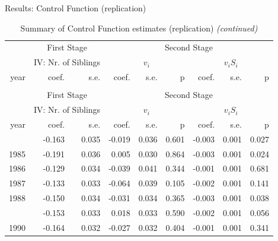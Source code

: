 \documentclass[10pt,ignorenonframetext,]{beamer}
\begin{document}
\begin{frame}{Results: Control Function (replication)}
\protect\hypertarget{results-control-function-replication}{}

\begingroup\fontsize{7}{9}\selectfont

\begin{longtable}[t]{rrrrrrrrr}
\caption{\label{tab:unnamed-chunk-5}Summary of Control Function estimates (replication)}\\
\toprule
\multicolumn{1}{c}{ } & \multicolumn{2}{c}{First Stage} & \multicolumn{6}{c}{Second Stage} \\
\cmidrule(l{2pt}r{2pt}){2-3} \cmidrule(l{2pt}r{2pt}){4-9}
\multicolumn{1}{c}{ } & \multicolumn{2}{c}{IV: Nr. of Siblings} & \multicolumn{3}{c}{$v_i$} & \multicolumn{3}{c}{$v_i S_i$} \\
\cmidrule(l{2pt}r{2pt}){2-3} \cmidrule(l{2pt}r{2pt}){4-6} \cmidrule(l{2pt}r{2pt}){7-9}
year & coef. & s.e. & coef. & s.e. & p & coef. & s.e. & p\\
\midrule
\endfirsthead
\caption[]{Summary of Control Function estimates (replication) \textit{(continued)}}\\
\toprule
\multicolumn{1}{c}{ } & \multicolumn{2}{c}{First Stage} & \multicolumn{6}{c}{Second Stage} \\
\cmidrule(l{2pt}r{2pt}){2-3} \cmidrule(l{2pt}r{2pt}){4-9}
\multicolumn{1}{c}{ } & \multicolumn{2}{c}{IV: Nr. of Siblings} & \multicolumn{3}{c}{$v_i$} & \multicolumn{3}{c}{$v_i S_i$} \\
\cmidrule(l{2pt}r{2pt}){2-3} \cmidrule(l{2pt}r{2pt}){4-6} \cmidrule(l{2pt}r{2pt}){7-9}
year & coef. & s.e. & coef. & s.e. & p & coef. & s.e. & p\\
\midrule
\endhead
\
\endfoot
\bottomrule
\endlastfoot
1984 & -0.163 & 0.035 & -0.019 & 0.036 & 0.601 & -0.003 & 0.001 & 0.027\\
1985 & -0.191 & 0.036 & 0.005 & 0.030 & 0.864 & -0.003 & 0.001 & 0.024\\
1986 & -0.129 & 0.034 & -0.039 & 0.041 & 0.344 & -0.001 & 0.001 & 0.681\\
1987 & -0.133 & 0.033 & -0.064 & 0.039 & 0.105 & -0.002 & 0.001 & 0.141\\
1988 & -0.150 & 0.034 & -0.031 & 0.034 & 0.365 & -0.003 & 0.001 & 0.038\\
\addlinespace
1989 & -0.153 & 0.033 & 0.018 & 0.033 & 0.590 & -0.002 & 0.001 & 0.056\\
1990 & -0.164 & 0.032 & -0.027 & 0.032 & 0.404 & -0.001 & 0.001 & 0.341\\

\end{longtable}
\end{frame}
\end{document}

